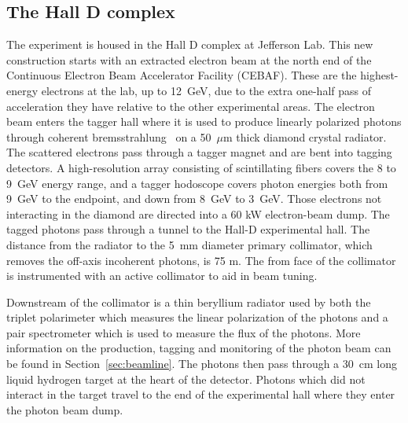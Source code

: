 \subsection[The Hall D complex]{The Hall D complex \label{sec:gluexexperiment:complex}}
The \gx{} experiment is housed in the Hall D complex at Jefferson Lab. This new construction starts with an extracted electron beam at the north end of the Continuous Electron Beam Accelerator Facility (CEBAF). These are the highest-energy electrons at the lab, up to 12~GeV, due to the extra one-half pass of acceleration they have relative to the other experimental areas. The electron beam enters the tagger hall where it is used to produce linearly polarized photons through coherent bremsstrahlung~\cite{} on a 50~$\mu$m thick diamond crystal radiator. The scattered electrons pass through a tagger magnet and are bent into tagging detectors. A high-resolution array consisting of scintillating fibers covers the 8 to 9~GeV energy range, and a tagger hodoscope covers photon energies both from 9~GeV to the endpoint, and down from 8~GeV to 3~GeV. Those electrons not interacting in the diamond are directed into a 60 kW electron-beam dump. The tagged photons pass through a tunnel to the Hall-D experimental hall. The distance from the radiator to the 5~mm diameter primary collimator, which removes the off-axis incoherent photons, is 75 m. The from face of the collimator is instrumented with an active collimator to aid in beam tuning. 

Downstream of the collimator is a thin beryllium radiator used by both the triplet polarimeter which measures the linear polarization of the photons and a pair spectrometer which is used to measure the flux of the photons. More information on the production, tagging and monitoring of the photon beam can be found in Section~\ref{sec:beamline}. The photons then pass through a 30~cm long liquid hydrogen target at the heart of the \gx{} detector. Photons which did not interact in the target travel to the end of the experimental hall where they enter the photon beam dump.

